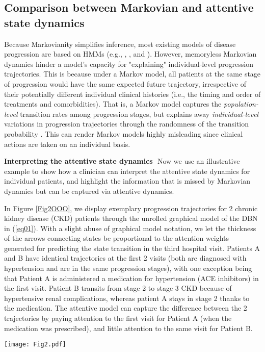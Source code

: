 \documentclass[twoside,11pt]{article}
\begin{document}
\newpage
\subsection*{Comparison between Markovian and attentive state dynamics}
Because Markovianity simplifies inference, most existing models of disease progression are based on HMMs (e.g., \cite{alaa2017learning}, \cite{liu2015efficient}, and \cite{wang2014unsupervised}). However, memoryless Markovian dynamics hinder a model's capacity for "explaining" individual-level progression trajectories. This is because under a Markov model, all patients at the same stage of progression would have the same expected future trajectory, irrespective of their potentially different individual clinical histories (i.e., the timing and order of treatments and comorbidities). That is, a Markov model captures the {\it population-level} transition rates among progression stages, but explains away {\it individual-level} variations in progression trajectories through the randomness of the transition probability \mbox{\footnotesize }. This can render Markov models highly misleading since clinical actions are taken on an individual basis. 

{\bf Interpreting the attentive state dynamics}\,\, Now we use an illustrative example to show how a clinician can interpret the attentive state dynamics for individual patients, and highlight the information that is missed by Markovian dynamics but can be captured via attentive dynamics.  

\begin{minipage}{0.515\textwidth}
In Figure \ref{Fig2OOO}, we display exemplary progression trajectories for 2 chronic kidney disease (CKD) patients through the unrolled graphical model of the DBN in (\ref{eq01}). With a slight abuse of graphical model notation, we let the thickness of the arrows connecting states be proportional to the attention weights generated for predicting the state transition in the third hospital visit. Patients A and B have identical trajectories at the first 2 visits (both are diagnosed with hypertension and are in the same progression stages), with one exception being that Patient A is administered a medication for hypertension (ACE inhibitors) in the first visit. Patient B transits from stage 2 to stage 3 CKD because of hypertensive renal complications, whereas patient A stays in stage 2 thanks to the medication. The attentive model can capture the difference between the 2 trajectories by paying attention to the first visit for Patient A (when the medication was prescribed), and little attention to the same visit for Patient B.   
\end{minipage}
\hfill
\begin{minipage}[h]{0.475\textwidth}
  \centering
  \texttt{[image: Fig2.pdf]}
	\label{Fig2OOO}
\end{minipage} 
\end{document}
